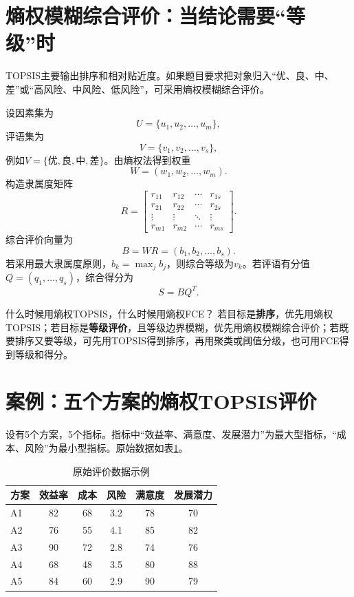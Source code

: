\documentclass[UTF8,a4paper,12pt,fontset=none]{ctexart}
\begin{document}
\section{熵权模糊综合评价：当结论需要“等级”时}

TOPSIS主要输出排序和相对贴近度。如果题目要求把对象归入“优、良、中、差”或“高风险、中风险、低风险”，可采用熵权模糊综合评价。

设因素集为
\[
U=\{u_1,u_2,\ldots,u_m\},
\]
评语集为
\[
V=\{v_1,v_2,\ldots,v_s\},
\]
例如$V=\{\text{优},\text{良},\text{中},\text{差}\}$。由熵权法得到权重
\[
W=(w_1,w_2,\ldots,w_m).
\]
构造隶属度矩阵
\[
R=\begin{bmatrix}
r_{11}&r_{12}&\cdots&r_{1s}\\
r_{21}&r_{22}&\cdots&r_{2s}\\
\vdots&\vdots&\ddots&\vdots\\
r_{m1}&r_{m2}&\cdots&r_{ms}
\end{bmatrix}.
\]
综合评价向量为
\[
B=WR=(b_1,b_2,\ldots,b_s).
\]
若采用最大隶属度原则，$b_k=\max_j b_j$，则综合等级为$v_k$。若评语有分值$Q=(q_1,\ldots,q_s)$，综合得分为
\[
S=BQ^T.
\]

\begin{keybox}{什么时候用熵权TOPSIS，什么时候用熵权FCE？}
若目标是\textbf{排序}，优先用熵权TOPSIS；若目标是\textbf{等级评价}，且等级边界模糊，优先用熵权模糊综合评价；若既要排序又要等级，可先用TOPSIS得到排序，再用聚类或阈值分级，也可用FCE得到等级和得分。
\end{keybox}

\section{案例：五个方案的熵权TOPSIS评价}

设有5个方案，5个指标。指标中“效益率、满意度、发展潜力”为最大型指标，“成本、风险”为最小型指标。原始数据如表\ref{tab:data}。

\begin{table}[H]
\centering
\caption{原始评价数据示例}
\label{tab:data}
\begin{tabular}{lccccc}
\toprule
方案 & 效益率 & 成本 & 风险 & 满意度 & 发展潜力\\
\midrule
A1 & 82 & 68 & 3.2 & 78 & 70\\
A2 & 76 & 55 & 4.1 & 85 & 82\\
A3 & 90 & 72 & 2.8 & 74 & 76\\
A4 & 68 & 48 & 3.5 & 80 & 88\\
A5 & 84 & 60 & 2.9 & 90 & 79\\
\bottomrule
\end{tabular}
\end{table}
\end{document}

